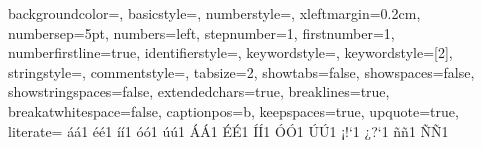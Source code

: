 


 {%
  backgroundcolor=\color{codeBakground},
  basicstyle={\footnotesize\ttfamily},
  numberstyle=\tiny\color{codeNumbers},
  xleftmargin={0.2cm},
  numbersep=5pt,
  numbers=left,
  stepnumber=1,
  firstnumber=1,
  numberfirstline=true,
  identifierstyle=\color{black},
  keywordstyle=\color{codeKeyword},
  keywordstyle={[2]\color{codeKeyword}},
  stringstyle=\color{codeString}\ttfamily,
  commentstyle=\color{codeComment}\ttfamily,
  tabsize=2,
  showtabs=false,
  showspaces=false,
  showstringspaces=false,
  extendedchars=true,
  breaklines=true,
  breakatwhitespace=false,
  captionpos=b,
  keepspaces=true,
  upquote=true,                      %
  literate=%
  {á}{{\'a}}1 {é}{{\'e}}1 {í}{{\'i}}1 {ó}{{\'o}}1 {ú}{{\'u}}1
  {Á}{{\'A}}1 {É}{{\'E}}1 {Í}{{\'I}}1 {Ó}{{\'O}}1 {Ú}{{\'U}}1
  {¡}{{!`}}1  {¿}{{?`}}1
  {ñ}{{\~n}}1 {Ñ}{{\~N}}1
}

\lstset{style=mystyle}

